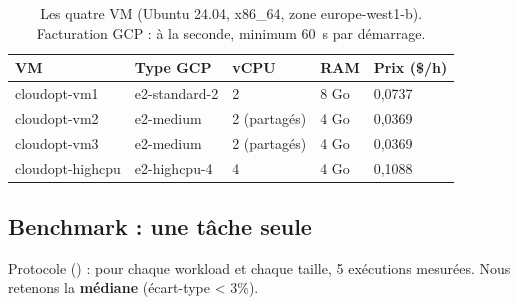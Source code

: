 \begin{table}[H]
\centering\small
\begin{tabular}{lllll}
\toprule
\textbf{VM} & \textbf{Type GCP} & \textbf{vCPU} & \textbf{RAM} & \textbf{Prix (\$/h)} \\
\midrule
cloudopt-vm1     & e2-standard-2 & 2            & 8 Go & 0,0737 \\
cloudopt-vm2     & e2-medium     & 2 (partagés) & 4 Go & 0,0369 \\
cloudopt-vm3     & e2-medium     & 2 (partagés) & 4 Go & 0,0369 \\
cloudopt-highcpu & e2-highcpu-4  & 4            & 4 Go & 0,1088 \\
\bottomrule
\end{tabular}
\caption{Les quatre VM (Ubuntu 24.04, x86\_64, zone europe-west1-b). Facturation GCP : à la seconde, minimum 60~s par démarrage.}
\label{tab:vms}
\end{table}

\subsection{Benchmark : une tâche seule}

Protocole () : pour chaque workload et chaque taille,
5 exécutions mesurées. Nous retenons la \textbf{médiane}
(écart-type < 3\%).

